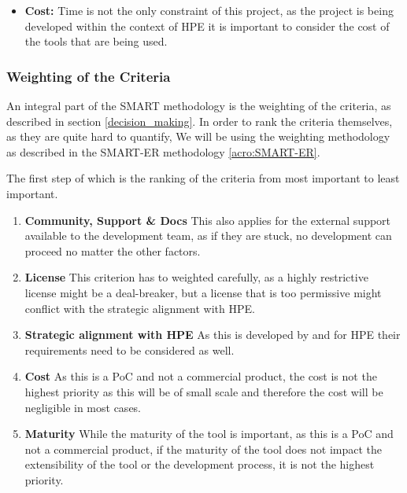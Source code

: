 \begin{itemize}
    \item \textbf{Cost:}
        Time is not the only constraint of this project, as the project is being developed within the context of \ac{HPE} it is important to consider the cost of the tools that are being used.

\end{itemize}

\subsubsection{Weighting of the Criteria}

An integral part of the \ac{SMART} methodology is the weighting of the criteria, as described in section \ref{decision_making}.
In order to rank the criteria themselves, as they are quite hard to quantify, 
We will be using the weighting methodology as described in the \ac{SMART-ER} methodology \ref{acro:SMART-ER}.

The first step of which is the ranking of the criteria from most important to least important.

\begin{enumerate}
    \item \textbf{ Community, Support \& Docs } This also applies for the external support available to the development team, as if they are stuck, no development can proceed no matter the other factors. 
    \item \textbf{ License } This criterion has to weighted carefully, as a highly restrictive license might be a deal-breaker, but a license that is too permissive might conflict with the strategic alignment with \ac{HPE}.
    \item \textbf{ Strategic alignment with \ac{HPE} } As this is developed by and for \ac{HPE} their requirements need to be considered as well.
    \item \textbf{ Cost } As this is a \ac{PoC} and not a commercial product, the cost is not the highest priority as this will be of small scale and therefore the cost will be negligible in most cases.
    \item \textbf{ Maturity } While the maturity of the tool is important, as this is a \ac{PoC} and not a commercial product, if the maturity of the tool does not impact the extensibility of the tool or the development process, it is not the highest priority.
\end{enumerate}

